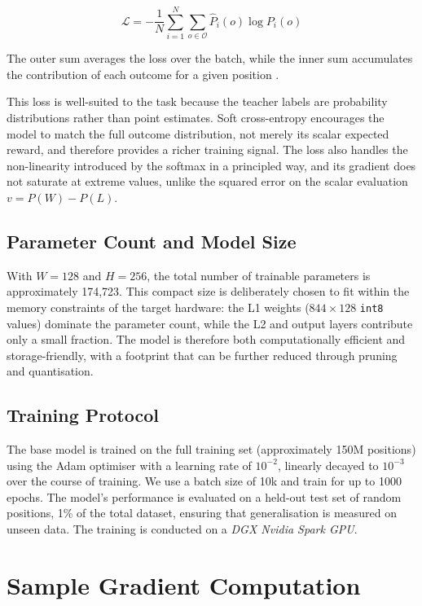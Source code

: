 \[
\mathcal{L} = -\frac{1}{N} \sum_{i=1}^N \sum_{o \in \mathcal{O}} \hat{P}_i(o) \log P_i(o)
\]

The outer sum averages the loss over the batch, while the inner sum accumulates the contribution of each outcome for a given position \parencite{hinton2015}.

This loss is well-suited to the task because the teacher labels are probability distributions rather than point estimates. Soft cross-entropy encourages the model to match the full outcome distribution, not merely its scalar expected reward, and therefore provides a richer training signal. The loss also handles the non-linearity introduced by the softmax in a principled way, and its gradient does not saturate at extreme values, unlike the squared error on the scalar evaluation $v = P(W) - P(L)$.

\subsection{Parameter Count and Model Size}

With $W = 128$ and $H = 256$, the total number of trainable parameters is approximately 174,723. This compact size is deliberately chosen to fit within the memory constraints of the target hardware: the L1 weights ($844 \times 128$ \texttt{int8} values) dominate the parameter count, while the L2 and output layers contribute only a small fraction. The model is therefore both computationally efficient and storage-friendly, with a footprint that can be further reduced through pruning and quantisation.

\subsection{Training Protocol}

The base model is trained on the full training set (approximately 150M positions) using the Adam optimiser with a learning rate of $10^{-2}$, linearly decayed to $10^{-3}$ over the course of training. We use a batch size of 10k and train for up to 1000 epochs. The model's performance is evaluated on a held-out test set of random positions, 1\% of the total dataset, ensuring that generalisation is measured on unseen data. The training is conducted on a \emph{DGX Nvidia Spark GPU}.

\section{Sample Gradient Computation}

